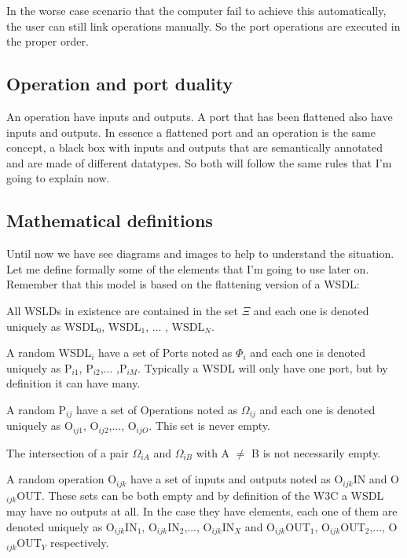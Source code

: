 \documentclass[a4paper,10pt]{article}
\begin{document}
  In the worse case scenario that the computer fail to achieve this automatically, the user can still link operations manually. So the port operations are executed in the proper order.

  \subsection{Operation and port duality}

  An operation have inputs and outputs. A port that has been flattened also have inputs and outputs. In essence a flattened port and an operation is the same concept, a black box with inputs and outputs that are semantically annotated and are made of different datatypes. So both will follow the same rules that I'm going to explain now.

  \subsection{Mathematical definitions}

  Until now we have see diagrams and images to help to understand the situation. Let me define formally some of the elements that I'm going to use later on. Remember that this model is based on the flattening version of a WSDL:\vspace{3 mm}

  All WSLDs in existence are contained in the set $\Xi$ and each one is denoted uniquely as WSDL$_{0}$, WSDL$_{1}$, ... , WSDL$_{N}$.\vspace{3 mm}

  A random WSDL$_{i}$ have a set of Ports noted as $\Phi_{i}$ and each one is denoted uniquely as P$_{i1}$, P$_{i2}$,... ,P$_{iM}$. Typically a WSDL will only have one port, but by definition it can have many.\vspace{3 mm}

  A random P$_{ij}$ have a set of Operations noted as $\Omega_{ij}$ and each one is denoted uniquely as O$_{ij1}$, O$_{ij2}$,..., O$_{ijO}$. This set is never empty.\vspace{3 mm}

  The intersection of a pair $\Omega_{iA}$ and $\Omega_{iB}$ with A $\neq$ B is not necessarily empty.\vspace{3 mm}
  
  A random operation O$_{ijk}$ have a set of inputs and outputs noted as O$_{ijk}$IN and O$_{ijk}$OUT. These sets can be both empty and by definition of the W3C a WSDL may have no outputs at all. In the case they have elements, each one of them are denoted uniquely as  O$_{ijk}$IN$_{1}$,  O$_{ijk}$IN$_{2}$,..., O$_{ijk}$IN$_{X}$ and O$_{ijk}$OUT$_{1}$,  O$_{ijk}$OUT$_{2}$,..., O$_{ijk}$OUT$_{Y}$ respectively.\vspace{3 mm}
\end{document}
